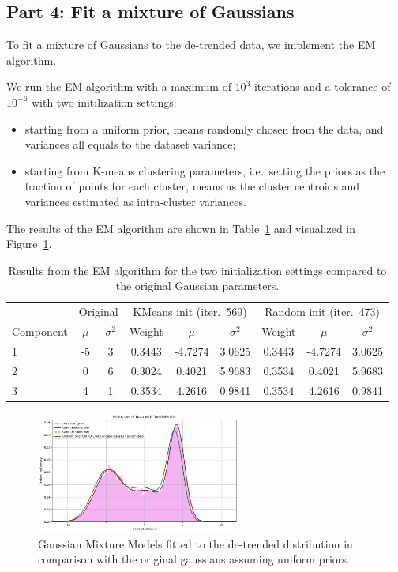\documentclass[a4paper]{article}
\begin{document}
\subsection*{Part 4: Fit a mixture of Gaussians}

To fit a mixture of Gaussians to the de-trended data, we implement the EM algorithm.

We run the EM algorithm with a maximum of $10^3$ iterations and a tolerance of $10^{-6}$ with two initilization settings:
\begin{itemize}
    \setlength\itemsep{0.01em}
  \item starting from a uniform prior, means randomly chosen from the data, and variances all equals to the dataset variance;
  \item starting from K-means clustering parameters, i.e.~setting the priors as the fraction of points for each cluster, means as the cluster centroids and variances estimated as intra-cluster variances.
\end{itemize}

The results of the EM algorithm are shown in Table~\ref{tab:gmm-results} and visualized in Figure~\ref{fig:gmm-plot}.

\begin{table}[htbp]
  \centering
  \small
  \begin{tabular}{l cc|ccc|ccc}
    \toprule
    & \multicolumn{2}{c}{Original} & \multicolumn{3}{c}{KMeans init (iter.\ 569)} & \multicolumn{3}{c}{Random init (iter.\ 473)} \\
    \cmidrule(lr){2-3} \cmidrule(lr){4-6} \cmidrule(lr){7-9}
    Component & $\mu$ & $\sigma^2$ & Weight & $\mu$ & $\sigma^2$ & Weight & $\mu$ & $\sigma^2$ \\
    \midrule
    1 &  -5 & 3 & 0.3443 & -4.7274 & 3.0625 & 0.3443 & -4.7274 & 3.0625 \\
    2 &  0 & 6 & 0.3024 & 0.4021 & 5.9683 & 0.3534 & 0.4021 & 5.9683 \\
    3 & 4 & 1 & 0.3534 & 4.2616 & 0.9841 & 0.3534 & 4.2616 & 0.9841 \\
    \bottomrule
  \end{tabular}
  \caption{
    Results from the EM algorithm for the two initialization settings compared to the original Gaussian parameters.
  }\label{tab:gmm-results}
\end{table}

\begin{figure}[htbp]
  \centering
  \includegraphics[width=0.6\textwidth]{images/gmm.png}\caption{
    Gaussian Mixture Models fitted to the de-trended distribution in comparison with the original gaussians assuming uniform priors.
  }\label{fig:gmm-plot}
\end{figure}
\end{document}
